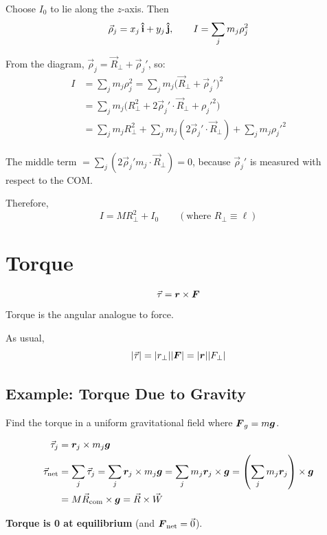 Choose $I_0$ to lie along the $z$-axis. Then
\[
    \vec{\rho}_j = x_j\,\boldsymbol{\hat{\textbf{i}}} + y_j\,\boldsymbol{\hat{\textbf{j}}}, \qquad I = \sum_j m_j \rho_j^2
\]

From the diagram, $\vec{\rho}_j = \vec{R}_\perp + \vec{\rho}_j'$, so:
\begin{align*}
    I &= \sum_j m_j \rho_j^2 = \sum_j m_j\bigl(\vec{R}_\perp+\vec{\rho}_j'\bigr)^2 \\
    &= \sum_j m_j\bigl(R_\perp^2 + 2\vec{\rho}_j'\cdot\vec{R}_\perp + {\rho_j'}^2\bigr) \\
    &= \sum_j m_j R_\perp^2 + \sum_j m_j(2\vec{\rho}_j'\cdot\vec{R}_\perp)
       + \sum_j m_j {\rho_j'}^2
\end{align*}

The middle term $= \sum_j(2\vec{\rho}_j' m_j \cdot \vec{R}_\perp) = 0$, because $\vec{\rho}_j'$ is measured with respect to the COM.

Therefore,
\[
    I = MR_\perp^2 + I_0 \qquad (\text{where }R_\perp \equiv \ell)
\]

\section{Torque}

\begin{definition}[Torque]
\[
    \vec{\tau} = \lvect{r}\times\vect{F}
\]
Torque is the angular analogue to force.
\end{definition}

As usual,
\[
    |\vec{\tau}| = |r_\perp||\vect{F}| = |\lvect{r}||F_\perp|
\]

\subsection{Example: Torque Due to Gravity}

Find the torque in a uniform gravitational field where $\vect{F}_g = m\lvect{g}$.

\begin{align*}
    \vec{\tau}_j &= \bm{r}_j \times m_j \bm{g} \\
    \vec{\tau}_\text{net} &= \sum_j \vec{\tau}_j
        = \sum_j \bm{r}_j \times m_j \bm{g}
        = \sum_j m_j \bm{r}_j \times \bm{g}
        = \left(\sum_j m_j \bm{r}_j\right)\times\bm{g} \\
    &= M\vec{R}_\text{com}\times\bm{g} = \vec{R}\times\vec{W}
\end{align*}

\textbf{Torque is 0 at equilibrium} (and $\vect{F}_\text{net}=\vec{0}$).

